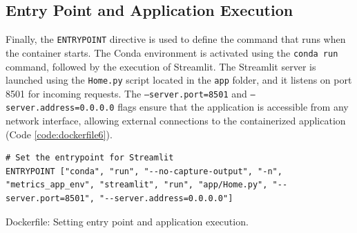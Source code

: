 \subsection{Entry Point and Application Execution}

Finally, the \texttt{ENTRYPOINT} directive is used to define the command that runs when the container starts. The Conda environment is activated using the \texttt{conda run} command, followed by the execution of Streamlit. The Streamlit server is launched using the \texttt{Home.py} script located in the \texttt{app} folder, and it listens on port 8501 for incoming requests. The \texttt{--server.port=8501} and \texttt{--server.address=0.0.0.0} flags ensure that the application is accessible from any network interface, allowing external connections to the containerized application (Code \ref{code:dockerfile6}).

\begin{longlisting}
\begin{verbatim}
# Set the entrypoint for Streamlit
ENTRYPOINT ["conda", "run", "--no-capture-output", "-n", "metrics_app_env", "streamlit", "run", "app/Home.py", "--server.port=8501", "--server.address=0.0.0.0"]
\end{verbatim}
\caption{Dockerfile: Setting entry point and application execution.}
\label{code:dockerfile6}
\end{longlisting}



